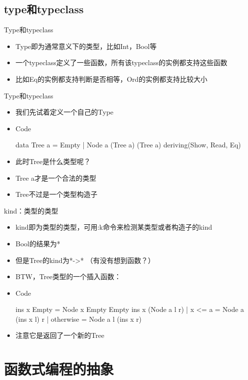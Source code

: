 \documentclass[xcolor=dvipsnames, 11pt]{beamer}
\newenvironment{code}{\begin{block}{Code}\begin{semiverbatim} \begin{footnotesize}}{\end{footnotesize}\end{semiverbatim}\end{block}}
\newenvironment{iit}{\begin{itemize}\setlength{\itemsep}{0.2cm}}{\end{itemize}}
\begin{document}
\subsection{type和typeclass}
\begin{frame}[fragile]{Type和typeclass}
\begin{iit}
\item<2->Type即为通常意义下的类型，比如Int，Bool等
\item<3->一个typeclass定义了一些函数，所有该typeclass的实例都支持这些函数
\item<4->比如Eq的实例都支持判断是否相等，Ord的实例都支持比较大小
\end{iit}
\end{frame}

\begin{frame}[fragile]{Type和typeclass}
\begin{iit}
\item<2->我们先试着定义一个自己的Type
\item<3->[]\begin{code}
data Tree a = Empty | Node a (Tree a) (Tree a) deriving(Show, Read, Eq)
\end{code}
\item<3->此时Tree是什么类型呢？
\item<4->Tree a才是一个合法的类型
\item<5->Tree不过是一个类型构造子
\end{iit}
\end{frame}

\begin{frame}[fragile]{kind：类型的类型}
\begin{iit}
\item<2->kind即为类型的类型，可用:k命令来检测某类型或者构造子的kind
\item<3->Bool的结果为*
\item<4->但是Tree的kind为*->* （有没有想到函数？）
\item<5->BTW，Tree类型的一个插入函数：
\item<6->[]\begin{code}
ins x Empty = Node x Empty Empty
ins x (Node a l r) 
    | x <= a = Node a (ins x l) r
    | otherwise = Node a l (ins x r)
\end{code}
\item<7-> 注意它是返回了一个新的Tree
\end{iit}
\end{frame}

\section{函数式编程的抽象}
\end{document}
